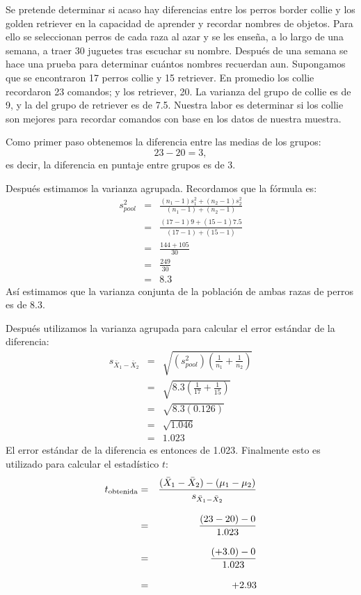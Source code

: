 \documentclass[a4paper,12pt]{article}
\begin{document}
Se pretende determinar si acaso hay diferencias entre los perros border collie y los golden retriever en la capacidad de aprender y recordar nombres de objetos. Para ello se seleccionan perros de cada raza al azar y se les enseña, a lo largo de una semana, a traer 30 juguetes tras escuchar su nombre. Después de una semana se hace una prueba para determinar cuántos nombres recuerdan aun. Supongamos que se encontraron 17 perros collie y 15 retriever. En promedio los collie recordaron 23 comandos; y los retriever, 20. La varianza del grupo de collie es de 9, y la del grupo de retriever es de 7.5. Nuestra labor es determinar si los collie son mejores para recordar comandos con base en los datos de nuestra muestra.

Como primer paso obtenemos la diferencia entre las medias de los grupos:
\[
  23 - 20 = 3
,\]
es decir, la diferencia en puntaje entre grupos es de 3.

Después estimamos la varianza agrupada. Recordamos que la fórmula es:
\begin{eqnarray*}
  s_{pool}^{2}&=&\frac{
    (n_{1} - 1)s_{1}^{2} + (n_{2} - 1)s_{2}^{2}
  }{
    (n_{1} - 1) + (n_{2} - 1)
  }\\[3mm]
  &=& \frac{
    (17 - 1) 9 + (15 - 1) 7{.}5
  }{
    (17 - 1) + (15 - 1)
  }\\[3mm]
  &=& \frac{
    144 + 105
  }{
    30
  }\\[3mm]
  &=& \frac{
    249
  }{
    30
  }\\[3mm]
  &=& 8{.}3
\end{eqnarray*}
Así estimamos que la varianza conjunta de la población de ambas razas de perros es de 8.3.

Después utilizamos la varianza agrupada para calcular el error estándar de la diferencia:
\begin{eqnarray*}
  s_{\bar{X}_{1} - \bar{X}_{2}}&=&\sqrt{
  \left(s_{pool}^{2}\right)\left(\frac{1}{n_{1}} + \frac{1}{n_{2}}\right)}\\[3mm]
  &=& \sqrt{
    8{.}3\left(\frac{1}{17} + \frac{1}{15}\right)
  }\\[3mm]
  &=& \sqrt{8{.}3(0{.}126)}\\[3mm]
  &=& \sqrt{1{.}046}\\
  &=& 1{.}023
\end{eqnarray*}
El error estándar de la diferencia es entonces de 1.023. Finalmente esto es utilizado para calcular el estadístico $t$:
\begin{eqnarray*}
  t_{\mbox{\scriptsize obtenida}}&=&\frac{
    (\bar{X}_{1} - \bar{X}_{2}) - (\mu_{1} - \mu_{2})
  }{
    s_{\bar{X}_{1} - \bar{X}_{2}}
  }\\[3mm]
  &=&\frac{
    (23 - 20) - 0
  }{
    1{.}023
  }\\[3mm]
  &=&\frac{
    (+3{.}0) - 0
  }{
    1{.}023
  }\\[3mm]
  &=&+2{.}93
\end{eqnarray*}
\end{document}
